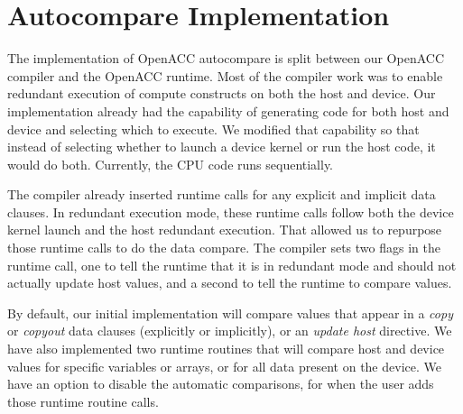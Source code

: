 \section{Autocompare Implementation}

The implementation of OpenACC autocompare is split between our OpenACC compiler and the OpenACC runtime.
Most of the compiler work was to enable redundant execution of compute constructs on both the host and device.
Our implementation already had the capability of generating code for both host and device and selecting which to execute.
We modified that capability so that instead of selecting whether to launch a device kernel or run the host code, it would do both.
Currently, the CPU code runs sequentially.

The compiler already inserted runtime calls for any explicit and implicit data clauses.
In redundant execution mode, these runtime calls follow both the device kernel launch and the host redundant execution.
That allowed us to repurpose those runtime calls to do the data compare.
The compiler sets two flags in the runtime call, one to tell the runtime that it is in redundant mode and should not actually update host values, and a second to tell the runtime to compare values.

By default, our initial implementation will compare values that appear in a \emph{copy} or \emph{copyout} data clauses (explicitly or implicitly), or an \emph{update host} directive.
We have also implemented two runtime routines that will compare host and device values for specific variables or arrays, or for all data present on the device.
We have an option to disable the automatic comparisons, for when the user adds those runtime routine calls.

